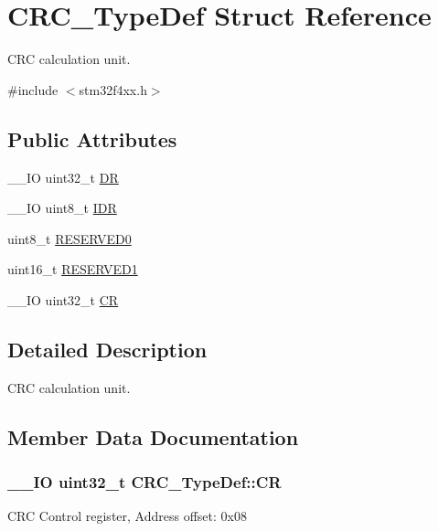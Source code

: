 \hypertarget{struct_c_r_c___type_def}{}\section{C\+R\+C\+\_\+\+Type\+Def Struct Reference}
\label{struct_c_r_c___type_def}


C\+R\+C calculation unit.  




{\ttfamily \#include $<$stm32f4xx.\+h$>$}

\subsection*{Public Attributes}
\begin{DoxyCompactItemize}
\item 
\+\_\+\+\_\+\+I\+O uint32\+\_\+t \hyperlink{struct_c_r_c___type_def_a50cb22870dbb9001241cec694994e5ef}{D\+R}
\item 
\+\_\+\+\_\+\+I\+O uint8\+\_\+t \hyperlink{struct_c_r_c___type_def_ad84e8694cd4b5375ee533c2d875c3b5a}{I\+D\+R}
\item 
uint8\+\_\+t \hyperlink{struct_c_r_c___type_def_a70dfd1730dba65041550ef55a44db87c}{R\+E\+S\+E\+R\+V\+E\+D0}
\item 
uint16\+\_\+t \hyperlink{struct_c_r_c___type_def_a8b205c6e25b1808ac016db2356b3021d}{R\+E\+S\+E\+R\+V\+E\+D1}
\item 
\+\_\+\+\_\+\+I\+O uint32\+\_\+t \hyperlink{struct_c_r_c___type_def_af33fa5c173e1c102e6d0242fe60e569f}{C\+R}
\end{DoxyCompactItemize}


\subsection{Detailed Description}
C\+R\+C calculation unit. 

\subsection{Member Data Documentation}
\hypertarget{struct_c_r_c___type_def_af33fa5c173e1c102e6d0242fe60e569f}{}
\subsubsection[{C\+R}]{\setlength{\rightskip}{0pt plus 5cm}\+\_\+\+\_\+\+I\+O uint32\+\_\+t C\+R\+C\+\_\+\+Type\+Def\+::\+C\+R}\label{struct_c_r_c___type_def_af33fa5c173e1c102e6d0242fe60e569f}
C\+R\+C Control register, Address offset\+: 0x08 \hypertarget{struct_c_r_c___type_def_a50cb22870dbb9001241cec694994e5ef}{}
